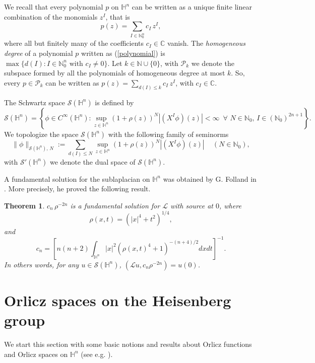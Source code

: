 \documentclass[oneside,10pt]{article}
\newtheorem{theorem}{Theorem}
\begin{document}
We recall that every polynomial $p$ on $\mathbb{H}^n$ can be written as a unique finite linear combination of the monomials $z^I$, that is
\begin{equation} \label{polynomial}
p(z) = \sum_{I \in \mathbb{N}_{0}^n} c_I \, z^I,
\end{equation}
where all but finitely many of the coefficients $c_I \in \mathbb{C}$ vanish. The \textit{homogeneous degree} of a polynomial $p$ written as 
(\ref{polynomial}) is $\max \{ d(I) : I \in \mathbb{N}_{0}^n \,\, \text{with} \,\, c_I \neq 0 \}$. Let $k \in \mathbb{N} \cup \{ 0 \}$, 
with $\mathcal{P}_{k}$ we denote the subspace formed by all the polynomials of homogeneous degree at 
most $k$. So, every $p \in \mathcal{P}_{k}$ can be written as $p(z) = \sum_{d(I) \leq k} c_I \, z^I$, with $c_I \in \mathbb{C}$.


The Schwartz space $\mathcal{S}(\mathbb{H}^{n})$ is defined by
\[
\mathcal{S}(\mathbb{H}^{n}) = \left\{ \phi \in C^{\infty}(\mathbb{H}^{n}) : \sup_{z \in \mathbb{H}^{n}} (1+\rho(z))^{N} 
|(X^{I} \phi)(z)| < \infty \,\,\, \forall \,\, N \in \mathbb{N}_{0}, \, I \in (\mathbb{N}_{0})^{2n+1}  \right\}.
\]
We topologize the space $\mathcal{S}(\mathbb{H}^{n})$ with the following family of seminorms
\[
\| \phi \|_{\mathcal{S}(\mathbb{H}^{n}), \, N} := \sum_{d(I) \leq N} \sup_{z \in \mathbb{H}^{n}} (1+\rho(z))^{N} |(X^{I} \phi)(z)| \,\,\,\,\,\,\, 
(N \in \mathbb{N}_{0}),
\]
with $\mathcal{S}'(\mathbb{H}^{n})$ we denote the dual space of $\mathcal{S}(\mathbb{H}^{n})$. 

A fundamental solution for the sublaplacian on $\mathbb{H}^n$ was obtained by G. Folland in \cite{Folland}. More precisely, he proved the following result.

\begin{theorem} \label{fund solution}
$c_n \, \rho^{-2n}$ is a fundamental solution for $\mathcal{L}$ with source at $0$, where
\[
\rho(x,t) = (|x|^4 + t^2)^{1/4},
\]
and
\[
c_n = \left[ n(n+2) \int_{\mathbb{H}^n} |x|^2 (\rho(x,t)^4 + 1)^{-(n+4)/2} dxdt \right]^{-1}.
\]
In others words, for any $u \in \mathcal{S}(\mathbb{H}^{n})$, $\left( \mathcal{L}u,  c_n \rho^{-2n} \right) = u(0)$.
\end{theorem}


\section{Orlicz spaces on the Heisenberg group} \label{LO}

We start this section with some basic notions and results about Orlicz functions and Orlicz spaces on $\mathbb{H}^n$ (see e.g. \cite{Hasto}).
\end{document}
